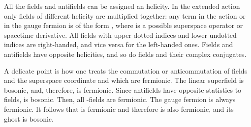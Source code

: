 \documentclass[a4paper,12pt]{article}
\begin{document}
All the fields and antifields can be assigned an helicity. In the
extended action only fields of different helicity are multiplied
together: any term in the action or in the gauge fermion is of the
form \coordHE{}, where \coordHE{} is a possible superspace operator or
spacetime derivative. All fields with upper dotted indices and lower
undotted indices are right-handed, and vice versa for the left-handed
ones. Fields and antifields have opposite helicities, and so do fields
and their complex conjugates.

A delicate point is how one treats the commutation or
anticommutation of fields and the superspace coordinate \myHighlight{$\theta^\alpha$}\coordHE{}
and \coordHE{} which are fermionic. The linear superfield \myHighlight{$\Sigma$}\coordHE{}
is bosonic, and, therefore, \myHighlight{$\sigma^\alpha$}\coordHE{} is fermionic. Since
antifields have opposite statistics to
fields, \myHighlight{$\sigma^*_\alpha$}\coordHE{} is bosonic. Then, 
all \myHighlight{$\sigma$}\coordHE{}-fields are
fermionic. The gauge fermion is always fermionic.
It follows that \coordHE{} is fermionic and therefore
\myHighlight{$\sigma^{[\alpha\beta]}$}\coordHE{} is also fermionic, and its ghost \myHighlight{$\lambda$}\coordHE{} is
bosonic. 
\end{document}
